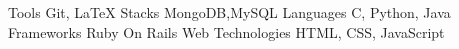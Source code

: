 




  \begin{cvskills}
  \cvskill
    {Tools}
    {Git, LaTeX} 
  \cvskill
    {Stacks}
    {MongoDB,MySQL}
  \cvskill
      {Languages}
      {C, Python, Java}
  \cvskill
    {Frameworks}
    {Ruby On Rails}
  \cvskill
    {Web Technologies}
    {HTML, CSS, JavaScript}

  \end{cvskills}